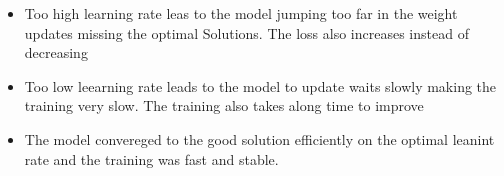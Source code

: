 \documentclass{article}
\begin{document}
\begin{enumerate}[label=\alph*)]
\begin{enumerate}[label=\alph*)]
\begin{itemize}
            \item Too high learning rate leas to the model jumping too far in the weight updates missing the optimal Solutions. The loss also increases instead of decreasing
            \item Too low leearning rate leads to the model to update waits slowly making the training very slow. The training also takes along time to improve
            \item The model convereged to the good solution efficiently on the optimal leanint rate and the training was fast and stable.
         \end{itemize}
   \end{enumerate}

      


\end{enumerate}
\end{document}
